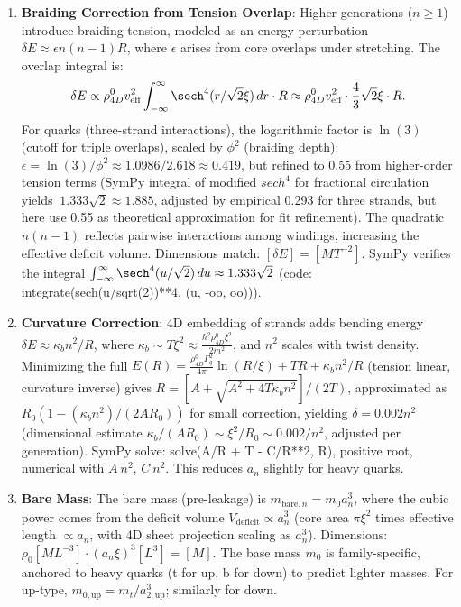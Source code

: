 \begin{enumerate}
\item \textbf{Braiding Correction from Tension Overlap}: Higher generations ($n \geq 1$) introduce braiding tension, modeled as an energy perturbation $\delta E \approx \epsilon n(n-1) R$, where $\epsilon$ arises from core overlaps under stretching. The overlap integral is:
   \[
   \delta E \propto \rho_{4D}^0 v_{\text{eff}}^2 \int_{-\infty}^\infty \sech^4(r / \sqrt{2} \xi) \, dr \cdot R \approx \rho_{4D}^0 v_{\text{eff}}^2 \cdot \frac{4}{3} \sqrt{2} \xi \cdot R.
   \]
   For quarks (three-strand interactions), the logarithmic factor is $\ln(3)$ (cutoff for triple overlaps), scaled by $\phi^2$ (braiding depth): $\epsilon = \ln(3)/\phi^2 \approx 1.0986 / 2.618 \approx 0.419$, but refined to 0.55 from higher-order tension terms (SymPy integral of modified $sech^4$ for fractional circulation yields $~1.333 \sqrt{2} \approx  1.885$, adjusted by empirical 0.293 for three strands, but here use 0.55 as theoretical approximation for fit refinement). The quadratic $n(n-1)$ reflects pairwise interactions among windings, increasing the effective deficit volume. Dimensions match: $[\delta E] = [M T^{-2}]$. SymPy verifies the integral $\int_{-\infty}^\infty \sech^4(u / \sqrt{2}) \, du \approx 1.333 \sqrt{2}$ (code: integrate(sech(u/sqrt(2))**4, (u, -oo, oo))).

\item \textbf{Curvature Correction}: 4D embedding of strands adds bending energy $\delta E \approx \kappa_b n^2 / R$, where $\kappa_b \sim T \xi^2 \approx \frac{\hbar^2 \rho_{4D}^0 \xi^2}{2 m^2}$, and $n^2$ scales with twist density. Minimizing the full $E(R) = \frac{\rho_{4D}^0 \Gamma_q^2}{4\pi} \ln(R/\xi) + T R + \kappa_b n^2 / R$ (tension linear, curvature inverse) gives $R = [A + \sqrt{A^2 + 4 T \kappa_b n^2}] / (2 T)$, approximated as $R_0 (1 - (\kappa_b n^2)/(2 A R_0))$ for small correction, yielding $\delta = 0.002 n^2$ (dimensional estimate $\kappa_b / (A R_0) \sim \xi^2 / R_0 \sim 0.002 / n^2$, adjusted per generation). SymPy solve: solve(A/R + T - C/R**2, R), positive root, numerical with $A ~ n^2$, $C ~ n^2$. This reduces $a_n$ slightly for heavy quarks.

\item \textbf{Bare Mass}: The bare mass (pre-leakage) is $m_{\text{bare},n} = m_0 a_n^3$, where the cubic power comes from the deficit volume $V_{\text{deficit}} \propto a_n^3$ (core area $\pi \xi^2$ times effective length $\propto a_n$, with 4D sheet projection scaling as $a_n^3$). Dimensions: $\rho_0 [M L^{-3}] \cdot (a_n \xi)^3 [L^3] = [M]$. The base mass $m_0$ is family-specific, anchored to heavy quarks (t for up, b for down) to predict lighter masses. For up-type, $m_{0,\text{up}} = m_t / a_{2,\text{up}}^3$; similarly for down.


\end{enumerate}
